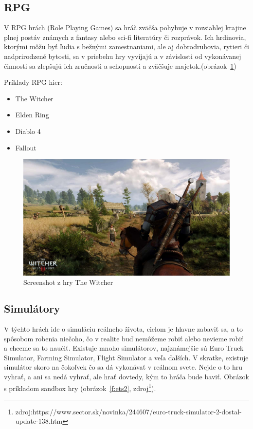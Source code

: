 \documentclass[10pt,oneside,slovak,a4paper]{article}
\begin{document}
\subsection{RPG} \label{zanre:rpg}

V RPG hrách (Role Playing Games) sa hráč zväčša pohybuje v rozsiahlej krajine plnej postáv známych z fantasy alebo sci-fi literatúry či rozprávok. Ich hrdinovia, ktorými môžu byť ľudia s bežnými  zamestnaniami, ale aj dobrodruhovia, rytieri či nadprirodzené bytosti, sa v priebehu hry vyvíjajú a v závislosti od vykonávanej činnosti sa zlepšujú ich zručnosti a schopnosti a zväčšuje majetok.(obrázok~\ref{f:rpg})

Príklady RPG hier:
\begin{itemize}
\item The Witcher
\item Elden Ring
\item Diablo 4
\item Fallout
\end{itemize}

\begin{figure}[h]
\centering
\includegraphics[scale=0.15]{rpg.jpg}
\caption{Screenshot z hry The Witcher}
\label{f:rpg}
\end{figure}


\subsection{Simulátory} \label{zanre:simulatory}

V týchto hrách ide o simuláciu reálneho života, cielom je hlavne zabaviť sa, a to spôsobom robenia niečoho, čo v realite buď nemôžeme robiť alebo nevieme robiť a chceme sa to naučiť. Existuje mnoho simulátorov, najznámejšie sú Euro Truck Simulator, Farming Simulator, Flight Simulator a veľa ďalších. V skratke, existuje simulátor skoro na čokoľvek čo sa dá vykonávať v reálnom svete. Nejde o to hru vyhrať, a ani sa nedá vyhrať, ale hrať dovtedy, kým to hráča bude baviť. Obrázok s príkladom sandbox hry (obrázok~\ref{f:ets2}, zdroj\footnote{zdroj:https://www.sector.sk/novinka/244607/euro-truck-simulator-2-dostal-update-138.htm}).
\end{document}
